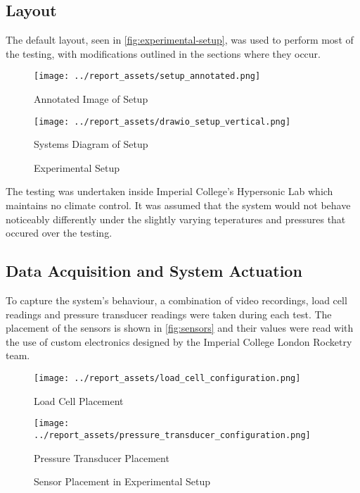 \subsection{Layout}
The default layout, seen in \autoref{fig:experimental-setup}, was used to perform most of the testing, with modifications outlined in the sections where they occur. 
\begin{figure}[htbp]
    \centering

    \begin{minipage}{0.6\textwidth}
        \centering
        \texttt{[image: ../report\_assets/setup\_annotated.png]}
        \caption*{Annotated Image of Setup}
    \end{minipage}
    \hfill
    \begin{minipage}{0.3\textwidth}
        \centering
        \texttt{[image: ../report\_assets/drawio\_setup\_vertical.png]}
        \caption*{Systems Diagram of Setup}
    \end{minipage}
    \caption{Experimental Setup}\label{fig:experimental-setup}
\end{figure}
The testing was undertaken inside Imperial College's Hypersonic Lab which maintains no climate control. It was assumed that the system would not behave noticeably differently under the slightly varying teperatures and pressures that occured over the testing.

\subsection{Data Acquisition and System Actuation}
To capture the system's behaviour, a combination of video recordings, load cell readings and pressure transducer readings were taken during each test. The placement of the sensors is shown in \autoref{fig:sensors} and their values were read with the use of custom electronics designed by the Imperial College London Rocketry team.
\begin{figure}[htbp]
    \centering

    \begin{minipage}{0.45\textwidth}
        \centering
        \texttt{[image: ../report\_assets/load\_cell\_configuration.png]}
        \caption*{Load Cell Placement}
    \end{minipage}
    \hfill
    \begin{minipage}{0.45\textwidth}
        \centering
        \texttt{[image: ../report\_assets/pressure\_transducer\_configuration.png]}
        \caption*{Pressure Transducer Placement}
    \end{minipage}
    \caption{Sensor Placement in Experimental Setup}\label{fig:sensors}
\end{figure}

